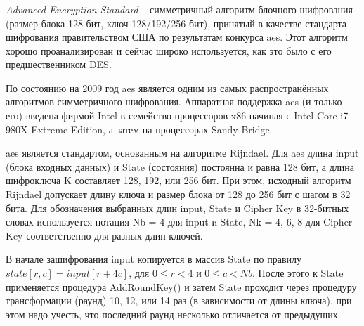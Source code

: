 \subsubsection{}
\label{sec:analysis:research:crypto:aes}

\emph{Advanced Encryption Standard} -- симметричный алгоритм блочного шифрования (размер блока 128 бит, ключ 128/192/256 бит), принятый в качестве стандарта шифрования правительством США по результатам конкурса \gls{aes}. Этот алгоритм хорошо проанализирован и сейчас широко используется, как это было с его предшественником DES\cite{wiki:aes}.

По состоянию на 2009 год \gls{aes} является одним из самых распространённых алгоритмов симметричного шифрования\cite{thg:aes}. Аппаратная поддержка \gls{aes} (и только его) введена фирмой Intel в семейство процессоров x86 начиная с Intel Core i7-980X Extreme Edition, а затем на процессорах Sandy Bridge.

\gls{aes} является стандартом, основанным на алгоритме Rijndael. Для \gls{aes} длина input (блока входных данных) и State (состояния) постоянна и равна 128 бит, а длина шифроключа K составляет 128, 192, или 256 бит. При этом, исходный алгоритм Rijndael допускает длину ключа и размер блока от 128 до 256 бит с шагом в 32 бита. Для обозначения выбранных длин input, State и Cipher Key в 32-битных словах используется нотация Nb = 4 для input и State, Nk = 4, 6, 8 для Cipher Key соответственно для разных длин ключей.

В начале зашифрования input копируется в массив State по правилу \(state[r,c]=input[r+4c]\), для \(0 \leq r < 4\) и \(0 \leq c < Nb\). После этого к State применяется процедура AddRoundKey() и затем State проходит через процедуру трансформации (раунд) 10, 12, или 14 раз (в зависимости от длины ключа), при этом надо учесть, что последний раунд несколько отличается от предыдущих.